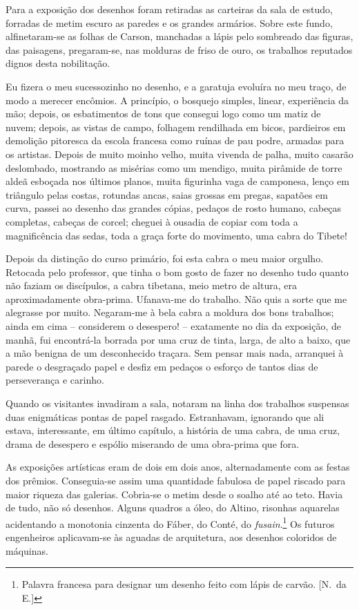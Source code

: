 Para a exposição dos desenhos foram retiradas as carteiras da sala de
estudo, forradas de metim escuro as paredes e os grandes armários.
Sobre este fundo, alfinetaram{}-se as folhas de Carson, manchadas a
lápis pelo sombreado das figuras, das paisagens, pregaram{}-se, nas
molduras de friso de ouro, os trabalhos reputados dignos desta
nobilitação. 

Eu fizera o meu sucessozinho no desenho, e a garatuja
evoluíra no meu traço, de modo a merecer encômios. A princípio, o
bosquejo simples, linear, experiência da mão; depois, os esbatimentos
de tons que consegui logo como um matiz de nuvem; depois, as vistas de
campo, folhagem rendilhada em bicos, pardieiros em demolição pitoresca
da escola francesa como ruínas de pau podre, armadas
para os artistas. Depois de muito moinho velho, muita vivenda de palha,
muito casarão deslombado, mostrando as misérias como um mendigo, muita
pirâmide de torre aldeã esboçada nos últimos planos, muita figurinha
vaga de camponesa, lenço em triângulo pelas costas, rotundas ancas,
saias grossas em pregas, sapatões em curva, passei ao desenho das
grandes cópias, pedaços de rosto humano, cabeças completas, cabeças de
corcel; cheguei à ousadia de copiar com toda a magnificência das sedas,
toda a graça forte do movimento, uma cabra do Tibete! 

Depois da distinção do curso primário, foi esta cabra o meu maior orgulho.
Retocada pelo professor, que tinha o bom gosto de fazer no desenho tudo
quanto não faziam os discípulos, a cabra tibetana, meio metro de
altura, era aproximadamente obra{}-prima. Ufanava{}-me do trabalho. Não
quis a sorte que me alegrasse por muito. Negaram{}-me à bela cabra a
moldura dos bons trabalhos; ainda em cima -- considerem o desespero!
-- exatamente no dia da exposição, de manhã, fui encontrá{}-la borrada
por uma cruz de tinta, larga, de alto a baixo, que a mão benigna de um
desconhecido traçara. Sem pensar mais nada, arranquei à parede o
desgraçado papel e desfiz em pedaços o esforço de tantos dias de
perseverança e carinho. 

Quando os visitantes invadiram a sala, notaram
na linha dos trabalhos suspensas duas enigmáticas pontas de papel
rasgado. Estranhavam, ignorando que ali estava, interessante, em último
capítulo, a história de uma cabra, de uma cruz, drama de desespero e
espólio miserando de uma obra{}-prima que fora. 

As exposições
artísticas eram de dois em dois anos, alternadamente com as festas dos
prêmios. Conseguia{}-se assim uma quantidade fabulosa de papel riscado
para maior riqueza das galerias. Cobria{}-se o metim desde o soalho até
ao teto. Havia de tudo, não só desenhos. Alguns quadros a óleo, do
Altino, risonhas aquarelas acidentando a monotonia cinzenta do Fáber,
do Conté, do \textit{fusain}.\footnote{ Palavra francesa para designar um desenho 
feito com lápis de carvão. [N.~da E.]} Os futuros engenheiros aplicavam{}-se às aguadas de
arquitetura, aos desenhos coloridos de máquinas. 

